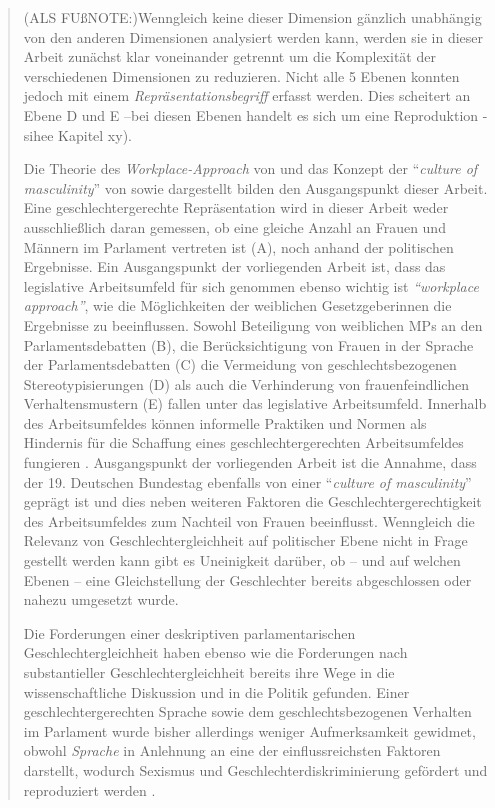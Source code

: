 \documentclass[12pt, 
    twoside=false, 
    bibliography=totoc, 
    numbers=endperiod, 
    headings=normal, 
    toc=chapterentrydotfill
    ]{scrbook}
\begin{document}
\begin{quote}
(ALS FUßNOTE:)Wenngleich keine dieser Dimension gänzlich unabhängig von den anderen Dimensionen analysiert werden kann, werden sie in dieser Arbeit zunächst klar voneinander getrennt um die Komplexität der verschiedenen Dimensionen zu reduzieren. Nicht alle 5 Ebenen konnten jedoch mit einem \emph{Repräsentationsbegriff} erfasst werden. Dies scheitert an Ebene D und E --bei diesen Ebenen handelt es sich um eine Reproduktion - sihee Kapitel xy). 



Die Theorie des \emph{Workplace-Approach} von \textcite{erikson_2018} und das Konzept der \enquote{\emph{culture of masculinity}} von \textcite{lovenduski_2005} sowie \textcite{erikson_2018} dargestellt bilden den Ausgangspunkt dieser Arbeit. Eine geschlechtergerechte Repräsentation wird in dieser Arbeit weder ausschließlich daran gemessen, ob eine gleiche Anzahl an Frauen und Männern im Parlament vertreten ist (A), noch anhand der politischen Ergebnisse. Ein Ausgangspunkt der vorliegenden Arbeit ist, dass das legislative Arbeitsumfeld für sich genommen ebenso wichtig ist \emph{\enquote{workplace approach}}, wie die Möglichkeiten der weiblichen Gesetzgeberinnen die Ergebnisse zu beeinflussen. Sowohl Beteiligung von weiblichen MPs an den Parlamentsdebatten (B), die Berücksichtigung von Frauen in der Sprache der Parlamentsdebatten (C) die Vermeidung von geschlechtsbezogenen Stereotypisierungen (D) als auch die Verhinderung von frauenfeindlichen Verhaltensmustern (E) fallen unter das legislative Arbeitsumfeld. 
Innerhalb des Arbeitsumfeldes können informelle Praktiken und Normen als Hindernis für die Schaffung eines geschlechtergerechten Arbeitsumfeldes fungieren \parencite[200]{erikson_2018}. Ausgangspunkt der vorliegenden Arbeit ist die Annahme, dass der 19. Deutschen Bundestag ebenfalls von einer \enquote{\emph{culture of masculinity}} geprägt ist und dies neben weiteren Faktoren die Geschlechtergerechtigkeit des Arbeitsumfeldes zum Nachteil von Frauen beeinflusst.
Wenngleich die Relevanz von Geschlechtergleichheit auf politischer Ebene nicht in Frage gestellt werden kann gibt es Uneinigkeit darüber, ob -- und auf welchen Ebenen -- eine  Gleichstellung der Geschlechter bereits abgeschlossen oder nahezu umgesetzt wurde.

Die Forderungen einer deskriptiven parlamentarischen Geschlechtergleichheit haben ebenso wie die Forderungen nach substantieller Geschlechtergleichheit bereits ihre Wege in die wissenschaftliche Diskussion und in die Politik gefunden. Einer geschlechtergerechten Sprache sowie dem geschlechtsbezogenen Verhalten im Parlament wurde bisher allerdings weniger Aufmerksamkeit gewidmet, obwohl \emph{Sprache} in Anlehnung an \textcite{menegatti_2017} eine der einflussreichsten Faktoren darstellt, wodurch Sexismus und Geschlechterdiskriminierung gefördert und reproduziert werden \parencite*[1]{menegatti_2017}.


\end{quote}
\end{document}
